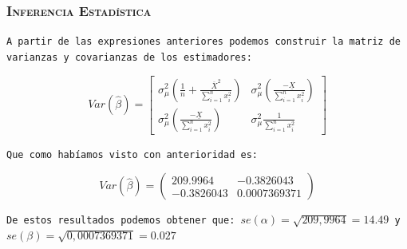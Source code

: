 \documentclass[16.5pt]{beamer}
\begin{document}
{
\begin{frame}
\frametitle{\textsc{Inferencia Estadística}}
\hspace*{-5mm}
\vspace*{-5mm} 

\texttt{A partir de las expresiones anteriores podemos construir la matriz de varianzas y covarianzas de los estimadores:}

$$Var(\hat\beta) = \begin{bmatrix} \sigma_{\mu}^2(\frac{1}{n}+ \frac{\overline{X}^2}{\sum_{i=1}^nx_i^2}) &   \sigma_{\mu}^2(\frac{-\underline{X}}{\sum_{i=1}^n x_i^2}) \\ \sigma_{\mu}^2(\frac{-\underline{X}}{\sum_{i=1}^n x_i^2}) &  \sigma_{\mu}^2\frac{1}{\sum_{i=1}^nx_i^2}  \end{bmatrix}$$

\texttt{Que como habíamos visto con anterioridad es:}

$$Var(\hat\beta)= \begin{pmatrix} 209.9964 &  -0.3826043 \\ -0.3826043 & 0.0007369371 \end{pmatrix}$$

\texttt{De estos resultados podemos obtener que: $se(\alpha) = \sqrt{209,9964} = 14.49$ y $se(\beta) = \sqrt{0,0007369371} = 0.027$}

\end{frame}
}
\end{document}
